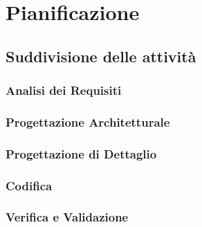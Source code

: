 \section{Pianificazione}
\subsection{Suddivisione delle attività}
\subsubsection{Analisi dei Requisiti}
\subsubsection{Progettazione Architetturale}
\subsubsection{Progettazione di Dettaglio}
\subsubsection{Codifica}
\subsubsection{Verifica e Validazione}